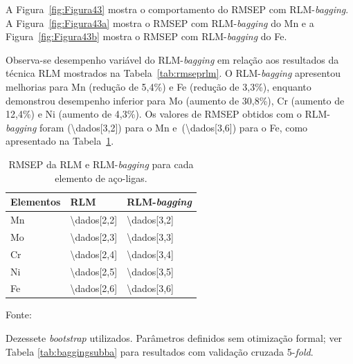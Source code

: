 A Figura~\ref{fig:Figura43} mostra o comportamento do RMSEP com RLM-\textit{bagging}. A Figura~\ref{fig:Figura43a} mostra o RMSEP com RLM-\textit{bagging} do Mn e a Figura~\ref{fig:Figura43b} mostra o RMSEP com RLM-\textit{bagging} do Fe.

Observa-se desempenho variável do RLM-\textit{bagging} em relação aos resultados da técnica RLM mostrados na Tabela~\ref{tab:rmseprlm}. O RLM-\textit{bagging} apresentou melhorias para Mn (redução de 5,4\%) e Fe (redução de 3,3\%), enquanto demonstrou desempenho inferior para Mo (aumento de 30,8\%), Cr (aumento de 12,4\%) e Ni (aumento de 4,3\%). Os valores de RMSEP obtidos com o RLM-\textit{bagging} foram (\num{\dados[3,2]}) para o Mn e~(\num{\dados[3,6]}) para o Fe, como apresentado na Tabela~\ref{tab:bagging}.




\begin{table}[!htbp]
\centering
\small
\begin{threeparttable}
\caption{RMSEP da RLM e RLM-\textit{bagging} para cada elemento de aço-ligas.}
\label{tab:bagging}
\begin{tabular}{p{3cm} p{4cm} p{4cm}} %
\toprule
\textbf{Elementos} & \textbf{RLM} & \textbf{RLM-\textit{bagging}} \tnote{a} \\ 
\midrule
Mn & \num{\dados[2,2]} & \num{\dados[3,2]} \\ 
Mo & \num{\dados[2,3]} & \num{\dados[3,3]} \\ 
Cr & \num{\dados[2,4]} & \num{\dados[3,4]} \\ 
Ni & \num{\dados[2,5]} & \num{\dados[3,5]} \\ 
Fe & \num{\dados[2,6]} & \num{\dados[3,6]} \\ 
\bottomrule
\end{tabular}

\begin{tablenotes}[flushleft] %
    \footnotesize
    \item \footnotesize{Fonte:~\oautor}
    \item[a] Dezessete \textit{bootstrap} utilizados. Parâmetros definidos sem otimização formal; ver Tabela \ref{tab:baggingsubba} para resultados com validação cruzada 5-\textit{fold}.
\end{tablenotes}
\end{threeparttable}
\end{table}


